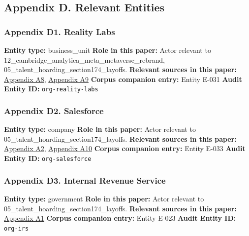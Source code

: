 \documentclass[
  american,
  11pt,
  letterpaper,
]{article}
\begin{document}
\subsection{Appendix D. Relevant
Entities}\label{appendix-d.-relevant-entities-5}

\subsubsection{Appendix D1. Reality
Labs}\label{ch-05-appendix-d1-reality-labs}

\textbf{Entity type:} business\_unit \textbf{Role in this paper:} Actor
relevant to 12\_cambridge\_analytica\_meta\_metaverse\_rebrand,
05\_talent\_hoarding\_section174\_layoffs. \textbf{Relevant sources in
this paper:}
\hyperref[ch-05-appendix-a8-meta-posts-lower-q4-profit-announces-huge-stock-buyback]{Appendix
A8},
\hyperref[ch-05-appendix-a9-meta-posts-sharp-profit-revenue-increase-in-q4-thanks-to-cost-cuts-and-advertising-rebound]{Appendix
A9} \textbf{Corpus companion entry:} Entity E-031 \textbf{Audit Entity
ID:} \texttt{org-reality-labs}

\subsubsection{Appendix D2.
Salesforce}\label{ch-05-appendix-d2-salesforce}

\textbf{Entity type:} company \textbf{Role in this paper:} Actor
relevant to 05\_talent\_hoarding\_section174\_layoffs. \textbf{Relevant
sources in this paper:}
\hyperref[ch-05-appendix-a2-amazon-salesforce-jettison-jobs-in-latest-tech-worker-purge]{Appendix
A2},
\hyperref[ch-05-appendix-a10-big-tech-layoffs-shattered-industry-worker-confidence]{Appendix
A10} \textbf{Corpus companion entry:} Entity E-033 \textbf{Audit Entity
ID:} \texttt{org-salesforce}

\subsubsection{Appendix D3. Internal Revenue
Service}\label{ch-05-appendix-d3-internal-revenue-service}

\textbf{Entity type:} government \textbf{Role in this paper:} Actor
relevant to 05\_talent\_hoarding\_section174\_layoffs. \textbf{Relevant
sources in this paper:}
\hyperref[ch-05-appendix-a1-notice-2023-63-guidance-on-section-174-and-specified-research-or-experimental-expenditures]{Appendix
A1} \textbf{Corpus companion entry:} Entity E-023 \textbf{Audit Entity
ID:} \texttt{org-irs}
\end{document}
